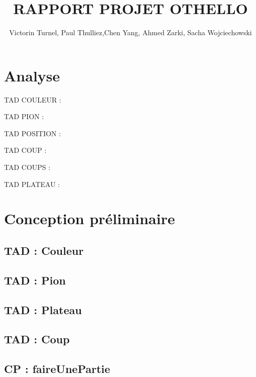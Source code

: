 \documentclass{article}
\title{RAPPORT PROJET OTHELLO}
\author{Victorin Turnel, Paul Thulliez,Chen Yang, Ahmed Zarki, Sacha Wojciechowski}
\begin{document}
\maketitle

\section{Analyse}

TAD COULEUR :



TAD PION :



TAD POSITION :



TAD COUP :




TAD COUPS :



TAD PLATEAU :



\section{Conception préliminaire}

\subsection{TAD : Couleur}



\subsection{TAD : Pion}



\subsection{TAD : Plateau}



\subsection{TAD : Coup}




\subsection{CP : faireUnePartie}

\end{document}
